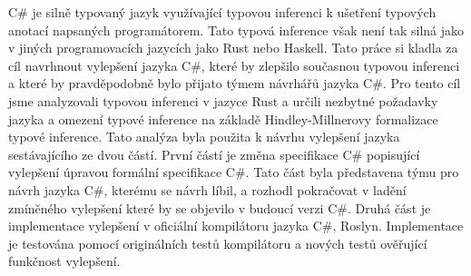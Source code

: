 \documentclass[12pt]{report}
\begin{document}

C\# je silně typovaný jazyk využívající typovou inferenci k ušetření typových anotací napsaných programátorem.
Tato typová inference však není tak silná jako v jiných programovacích jazycích jako Rust nebo Haskell.
Tato práce si kladla za cíl navrhnout vylepšení jazyka C\#, které by zlepšilo současnou typovou inferenci a které by pravděpodobně bylo přijato týmem návrhářů jazyka C\#.
Pro tento cíl jsme analyzovali typovou inferenci v jazyce Rust a určili nezbytné požadavky jazyka a omezení typové inference na základě Hindley-Millnerovy formalizace typové inference. 
Tato analýza byla použita k návrhu vylepšení jazyka sestávajícího ze dvou částí.
První částí je změna specifikace C\# popisující vylepšení úpravou formální specifikace C\#.
Tato část byla představena týmu pro návrh jazyka C\#, kterému se návrh líbil, a rozhodl pokračovat v ladění zmíněného vylepšení které by se objevilo v budoucí verzi C\#.
Druhá část je implementace vylepšení v oficiální kompilátoru jazyka C\#, Roslyn. 
Implementace je testována pomocí originálních testů kompilátoru a nových testů ověřující funkčnost vylepšení.
\end{document}
